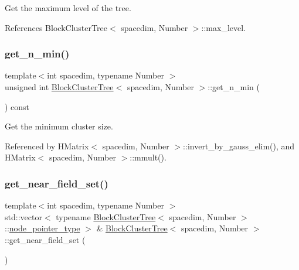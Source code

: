 Get the maximum level of the tree. 

References Block\+Cluster\+Tree$<$ spacedim, Number $>$\+::max\+\_\+level.

\mbox{\label{classBlockClusterTree_ab00acda5e8fd4c3e381637d8d9322923}} 
\subsubsection{\texorpdfstring{get\+\_\+n\+\_\+min()}{get\_n\_min()}}
{\footnotesize\ttfamily template$<$int spacedim, typename Number $>$ \\
unsigned int \hyperlink{classBlockClusterTree}{Block\+Cluster\+Tree}$<$ spacedim, Number $>$\+::get\+\_\+n\+\_\+min (\begin{DoxyParamCaption}{ }\end{DoxyParamCaption}) const}

Get the minimum cluster size. 

Referenced by H\+Matrix$<$ spacedim, Number $>$\+::invert\+\_\+by\+\_\+gauss\+\_\+elim(), and H\+Matrix$<$ spacedim, Number $>$\+::mmult().

\mbox{\label{classBlockClusterTree_a82f61b31f1e9cf869831fa4c8232df81}} 
\subsubsection{\texorpdfstring{get\+\_\+near\+\_\+field\+\_\+set()}{get\_near\_field\_set()}\hspace{0.1cm}{\footnotesize\ttfamily [1/2]}}
{\footnotesize\ttfamily template$<$int spacedim, typename Number $>$ \\
std\+::vector$<$ typename \hyperlink{classBlockClusterTree}{Block\+Cluster\+Tree}$<$ spacedim, Number $>$\+::\hyperlink{classTreeNode}{node\+\_\+pointer\+\_\+type} $>$ \& \hyperlink{classBlockClusterTree}{Block\+Cluster\+Tree}$<$ spacedim, Number $>$\+::get\+\_\+near\+\_\+field\+\_\+set (\begin{DoxyParamCaption}{ }\end{DoxyParamCaption})}

